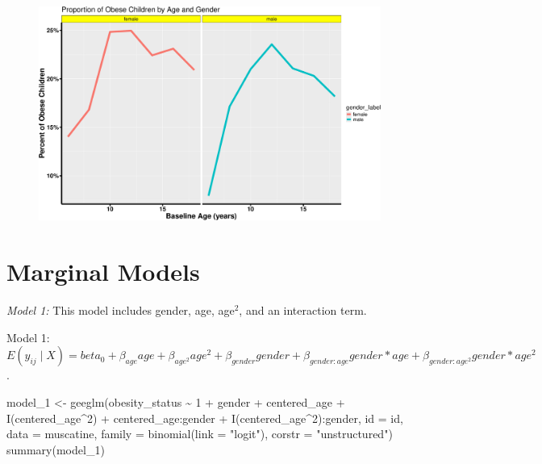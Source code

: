 \documentclass[
  letterpaper,
  DIV=11,
  numbers=noendperiod]{scrreprt}
\newenvironment{Shaded}{\begin{snugshade}}{\end{snugshade}}
\newcommand{\AttributeTok}[1]{\textcolor[rgb]{0.40,0.45,0.13}{#1}}
\newcommand{\DecValTok}[1]{\textcolor[rgb]{0.68,0.00,0.00}{#1}}
\newcommand{\FunctionTok}[1]{\textcolor[rgb]{0.28,0.35,0.67}{#1}}
\newcommand{\NormalTok}[1]{\textcolor[rgb]{0.00,0.23,0.31}{#1}}
\newcommand{\OtherTok}[1]{\textcolor[rgb]{0.00,0.23,0.31}{#1}}
\newcommand{\SpecialCharTok}[1]{\textcolor[rgb]{0.37,0.37,0.37}{#1}}
\newcommand{\StringTok}[1]{\textcolor[rgb]{0.13,0.47,0.30}{#1}}
\begin{document}
\begin{figure}[H]

{\centering \includegraphics{Longi_noncontinuous_files/figure-pdf/unnamed-chunk-11-1.pdf}

}

\end{figure}

\hypertarget{marginal-models}{%
\section{Marginal Models}\label{marginal-models}}

\emph{Model 1:} This model includes gender, age, age\(^2\), and an
interaction term.

Model 1:
\(E(y_{ij} \mid X) = beta_{0} + \beta_{age}age + \beta_{age^2}age^2 + \beta_{gender}gender + \beta_{gender:age}gender*age + \beta_{gender:age^2}gender*age^2\).

\begin{Shaded}
\begin{Highlighting}[]
\NormalTok{model\_1 }\OtherTok{\textless{}{-}} \FunctionTok{geeglm}\NormalTok{(obesity\_status }\SpecialCharTok{\textasciitilde{}} \DecValTok{1} \SpecialCharTok{+}\NormalTok{ gender }\SpecialCharTok{+}\NormalTok{ centered\_age }\SpecialCharTok{+} \FunctionTok{I}\NormalTok{(centered\_age}\SpecialCharTok{\^{}}\DecValTok{2}\NormalTok{) }\SpecialCharTok{+}
\NormalTok{    centered\_age}\SpecialCharTok{:}\NormalTok{gender }\SpecialCharTok{+} \FunctionTok{I}\NormalTok{(centered\_age}\SpecialCharTok{\^{}}\DecValTok{2}\NormalTok{)}\SpecialCharTok{:}\NormalTok{gender, }\AttributeTok{id =}\NormalTok{ id, }\AttributeTok{data =}\NormalTok{ muscatine, }\AttributeTok{family =} \FunctionTok{binomial}\NormalTok{(}\AttributeTok{link =} \StringTok{"logit"}\NormalTok{),}
    \AttributeTok{corstr =} \StringTok{"unstructured"}\NormalTok{)}
\FunctionTok{summary}\NormalTok{(model\_1)}
\end{Highlighting}
\end{Shaded}
\end{document}
